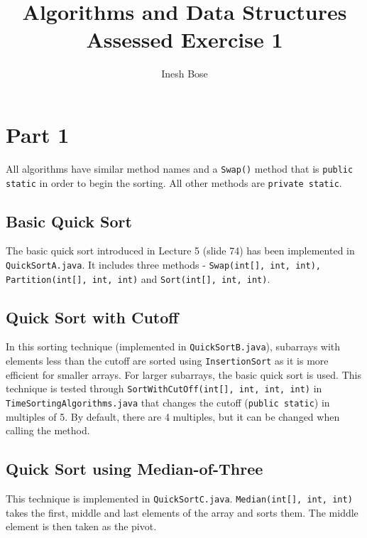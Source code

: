 \documentclass{article}
\title{Algorithms and Data Structures \\ Assessed Exercise 1}
\author{Inesh Bose}
\date{}
\newcommand{\code}[1]{\texttt{#1}}
\begin{document}
\maketitle
\tableofcontents


\newpage

\section{Part 1}
All algorithms have similar method names and a \code{Swap()} method that is \code{public static} in order to begin the sorting. All other methods are \code{private static}.

\bigskip

\subsection{Basic Quick Sort}
The basic quick sort introduced in Lecture 5 (slide 74) has been implemented in \code{QuickSortA.java}. It includes three methods - \code{Swap(int[], int, int), Partition(int[], int, int)} and \code{Sort(int[], int, int)}. \\

\subsection{Quick Sort with Cutoff}
In this sorting technique (implemented in \code{QuickSortB.java}), subarrays with elements less than the cutoff are sorted using \code{InsertionSort} as it is more efficient for smaller arrays. For larger subarrays, the basic quick sort is used. This technique is tested through \code{SortWithCutOff(int[], int, int, int)} in \code{TimeSortingAlgorithms.java} that changes the cutoff (\code{public static}) in multiples of 5. By default, there are 4 multiples, but it can be changed when calling the method. \\

\subsection{Quick Sort using Median-of-Three}
This technique is implemented in \code{QuickSortC.java}. \code{Median(int[], int, int)} takes the first, middle and last elements of the array and sorts them. The middle element is then taken as the pivot. \\
\end{document}
